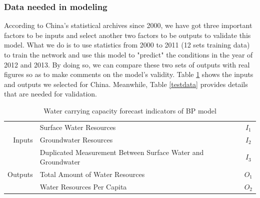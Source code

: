 \subsubsection{Data needed in modeling}
According to China's statistical archives since 2000, we have got three important factors to be inputs and select another two factors to be outputs to validate this model. What we do is to use statistics from 2000 to 2011 (12 sets training data) to train the network and use this model to "predict" the conditions in the year of 2012 and 2013. By doing so, we can compare these two sets of outputs with real figures so as to make comments on the model's validity. Table \ref{testi/o} shows the inputs and outputs we selected for China. Meanwhile, Table \ref{testdata} provides details that are needed for validation.
\begin{table}[!htbp]
\centering\caption{Water carrying capacity forecast indicators of BP model}
\begin{tabular}{r|l|c}
  \hline
   & Surface Water Resources&$I_1$\\
  Inputs & Groundwater Resources&$I_2$\\
   & Duplicated Measurement Between Surface Water and Groundwater&$I_3$\\
   \hline
  Outputs & Total Amount of Water Resources&$O_1$\\
   & Water Resources Per Capita&$O_2$\\
  \hline
\end{tabular}\label{testi/o}
\end{table}
